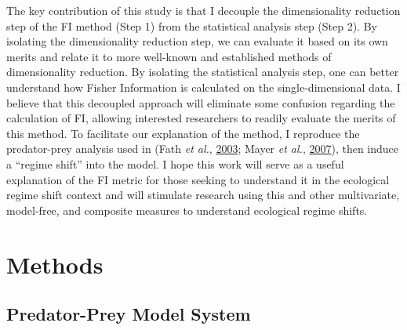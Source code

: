 \documentclass[12pt,twoside,openany]{reedthesis}
\begin{document}
The key contribution of this study is that I decouple the dimensionality reduction step of the FI method (Step 1) from the statistical analysis step (Step 2). By isolating the dimensionality reduction step, we can evaluate it based on its own merits and relate it to more well-known and established methods of dimensionality reduction. By isolating the statistical analysis step, one can better understand how Fisher Information is calculated on the single-dimensional data. I believe that this decoupled approach will eliminate some confusion regarding the calculation of FI, allowing interested researchers to readily evaluate the merits of this method. To facilitate our explanation of the method, I reproduce the predator-prey analysis used in (Fath \emph{et al.}, \protect\hyperlink{ref-fath_regime_2003}{2003}; Mayer \emph{et al.}, \protect\hyperlink{ref-mayer_applications_2007}{2007}), then induce a ``regime shift'' into the model. I hope this work will serve as a useful explanation of the FI metric for those seeking to understand it in the ecological regime shift context and will stimulate research using this and other multivariate, model-free, and composite measures to understand ecological regime shifts.

\hypertarget{methods-1}{%
\section{Methods}\label{methods-1}}

\hypertarget{predator-prey-model-system}{%
\subsection{Predator-Prey Model System}\label{predator-prey-model-system}}
\end{document}
